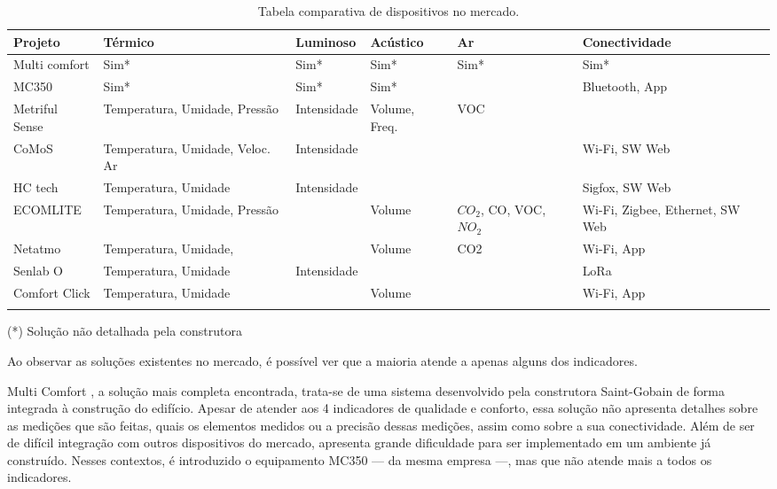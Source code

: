 \documentclass[../monografia.tex]{subfiles}
\begin{document}
\begin{center}
\begin{longtable}{ | m{2.5cm} | m{2.4cm}| m{2.2cm} |m{2cm} |m{2cm} |m{2.8cm} | } 
\hline
\textbf{Projeto} & \textbf{Térmico} & \textbf{Luminoso} & \textbf{Acústico} & \textbf{Ar} & \textbf{Conectividade} \\ 
\hline
Multi comfort \cite{multicomfort} & Sim* & Sim* & Sim* & Sim* & Sim* \\
\hline
MC350\cite{mc350} & Sim* & Sim* & Sim* & & Bluetooth, App \\
\hline
Metriful Sense\cite{metriful} & Temperatura, Umidade, Pressão & Intensidade & Volume, Freq. & VOC & \\
\hline
CoMoS\cite{CoMoS} & Temperatura, Umidade, Veloc. Ar & Intensidade & & & Wi-Fi, SW Web \\ 
\hline
HC tech\cite{HCTech} & Temperatura, Umidade & Intensidade & & & Sigfox, SW Web\\ 
\hline
ECOMLITE \cite{ECOMLITE} & Temperatura, Umidade, Pressão & & Volume & $CO_{2}$, CO, VOC, $NO_{2}$ & Wi-Fi, Zigbee, Ethernet, SW Web \\ 
\hline
Netatmo\cite{netatmo} & Temperatura, Umidade, & & Volume & CO2 & Wi-Fi, App\\ 
\hline
Senlab O\cite{Senlab} & Temperatura, Umidade & Intensidade & & & LoRa \\ \hline
Comfort Click\cite{comfortclick} & Temperatura, Umidade & & Volume & & Wi-Fi, App\\ 
\hline
\caption{Tabela comparativa de dispositivos no mercado.}
\label{table}
\end{longtable}
\end{center}

\begin{flushright}
(*) Solução não detalhada pela construtora
\end{flushright}

Ao observar as soluções existentes no mercado, é possível ver que a maioria atende a apenas alguns dos indicadores. 

Multi Comfort \cite{multicomfort}, a solução mais completa encontrada, trata-se de uma sistema desenvolvido pela construtora Saint-Gobain de forma integrada à construção do edifício. 
Apesar de atender aos 4 indicadores de qualidade e conforto, essa solução não apresenta detalhes sobre as medições que são feitas, quais os elementos medidos ou a precisão dessas medições, assim como sobre a sua conectividade. 
Além de ser de difícil integração com outros dispositivos do mercado, apresenta grande dificuldade para ser implementado em um ambiente já construído. Nesses contextos, é introduzido o equipamento MC350\cite{mc350} --- da mesma empresa ---, mas que não atende mais a todos os indicadores. 
\end{document}
